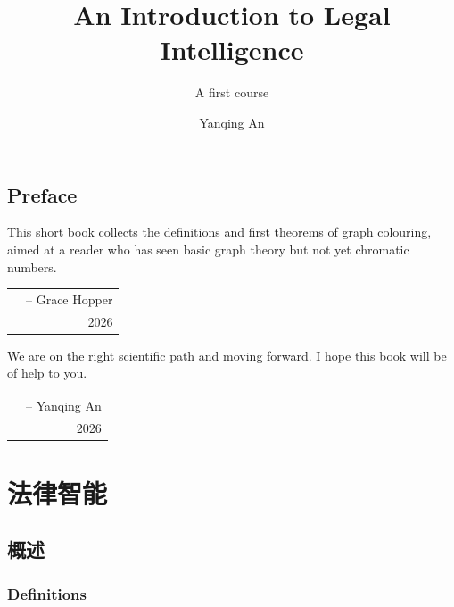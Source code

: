 \documentclass[lang=en,12pt]{beautybook}
\begin{document}
\thispagestyle{empty}
\title{An Introduction to Legal Intelligence}
\subtitle{A first course}
\bookseries{}
\author{Yanqing An}
\makecover

\makeatletter
{}
\oddoutermargin{\sffamily \leftmark}
\evenoutermargin{\sffamily\@title}
\makeatother


\frontmatter
{}

{\thispagestyle{empty}
\chapter*{Preface}
This short book collects the definitions and first theorems of graph
colouring, aimed at a reader who has seen basic graph theory but not yet
chromatic numbers.

\hfill
\begin{tabular}{lr}
    &-- Grace Hopper\\
    & 2026
\end{tabular}


We are on the right scientific path and moving forward. I hope this book will be of help to you.

\hfill
\begin{tabular}{lr}
    &-- Yanqing An\\
    & 2026
\end{tabular}
\clearpage}

\thispagestyle{empty}
\tableofcontents\let\cleardoublepage\clearpage

\mainmatter
{}

\part{法律智能}

\chapter{概述}

\section{Definitions}
\end{document}
